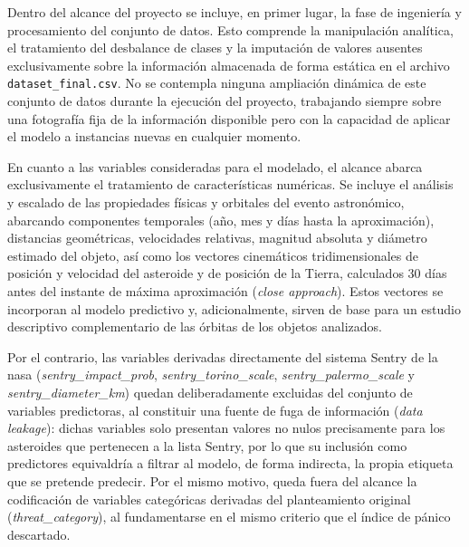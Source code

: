 \documentclass[12pt]{report} %
\begin{document}
Dentro del alcance del proyecto se incluye, en primer lugar, la fase de ingeniería y procesamiento del conjunto de datos. Esto comprende la manipulación analítica, el tratamiento del desbalance de clases y la imputación de valores ausentes exclusivamente sobre la información almacenada de forma estática en el archivo \texttt{dataset\_final.csv}. No se contempla ninguna ampliación dinámica de este conjunto de datos durante la ejecución del proyecto, trabajando siempre sobre una fotografía fija de la información disponible pero con la capacidad de aplicar el modelo a instancias nuevas en cualquier momento.

En cuanto a las variables consideradas para el modelado, el alcance abarca exclusivamente el tratamiento de características numéricas. Se incluye el análisis y escalado de las propiedades físicas y orbitales del evento astronómico, abarcando componentes temporales (año, mes y días hasta la aproximación), distancias geométricas, velocidades relativas, magnitud absoluta y diámetro estimado del objeto, así como los vectores cinemáticos tridimensionales de posición y velocidad del asteroide y de posición de la Tierra, calculados 30 días antes del instante de máxima aproximación (\textit{close approach}). Estos vectores se incorporan al modelo predictivo y, adicionalmente, sirven de base para un estudio descriptivo complementario de las órbitas de los objetos analizados.

Por el contrario, las variables derivadas directamente del sistema Sentry de la \gls{nasa} (\textit{sentry\_impact\_prob}, \textit{sentry\_torino\_scale}, \textit{sentry\_palermo\_scale} y \textit{sentry\_diameter\_km}) quedan deliberadamente excluidas del conjunto de variables predictoras, al constituir una fuente de fuga de información (\textit{data leakage}): dichas variables solo presentan valores no nulos precisamente para los asteroides que pertenecen a la lista Sentry, por lo que su inclusión como predictores equivaldría a filtrar al modelo, de forma indirecta, la propia etiqueta que se pretende predecir. Por el mismo motivo, queda fuera del alcance la codificación de variables categóricas derivadas del planteamiento original (\textit{threat\_category}), al fundamentarse en el mismo criterio que el índice de pánico descartado.
\end{document}
